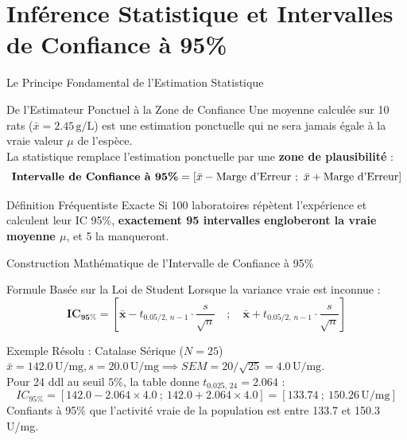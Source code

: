 \documentclass[aspectratio=169,10pt]{beamer}
\begin{document}
\section{Inférence Statistique et Intervalles de Confiance à 95\%}

\begin{frame}{Le Principe Fondamental de l'Estimation Statistique}
  \begin{conceptbox}{De l'Estimateur Ponctuel à la Zone de Confiance}
    Une moyenne calculée sur 10 rats ($\bar{x} = 2.45\,\text{g/L}$) est une estimation ponctuelle qui ne sera jamais égale à la vraie valeur $\mu$ de l'espèce.\\
    La statistique remplace l'estimation ponctuelle par une \textbf{zone de plausibilité} :
    \begin{equation*}
      \text{\textbf{Intervalle de Confiance à 95\%}} = \left[ \bar{x} - \text{Marge d'Erreur} \ ; \ \bar{x} + \text{Marge d'Erreur} \right]
    \end{equation*}
  \end{conceptbox}
  \vspace{1.5mm}
  \begin{biobox}{Définition Fréquentiste Exacte}
    Si 100 laboratoires répètent l'expérience et calculent leur IC 95\%, \textbf{exactement 95 intervalles engloberont la vraie moyenne $\mu$}, et 5 la manqueront.
  \end{biobox}
\end{frame}

\begin{frame}{Construction Mathématique de l'Intervalle de Confiance à 95\%}
  \begin{conceptbox}{Formule Basée sur la Loi de Student}
    Lorsque la variance vraie est inconnue :
    \begin{equation*}
      \mathbf{IC_{95\%}} = \left[ \mathbf{\bar{x}} - t_{0.05/2, \, n-1} \cdot \frac{s}{\sqrt{n}} \quad ; \quad \mathbf{\bar{x}} + t_{0.05/2, \, n-1} \cdot \frac{s}{\sqrt{n}} \right]
    \end{equation*}
  \end{conceptbox}
  \vspace{1mm}
  \begin{biobox}{Exemple Résolu : Catalase Sérique ($N=25$)}
    $\bar{x} = 142.0\,\text{U/mg}, s = 20.0\,\text{U/mg} \implies SEM = 20/\sqrt{25} = 4.0\,\text{U/mg}$.\\
    Pour 24 ddl au seuil $5\%$, la table donne $t_{0.025, \, 24} = 2.064$ :
    \begin{equation*}
      IC_{95\%} = [142.0 - 2.064 \times 4.0 \ ; \ 142.0 + 2.064 \times 4.0] = [\mathbf{133.74} \ ; \ \mathbf{150.26}\,\text{U/mg}]
    \end{equation*}
    Confiants à 95\% que l'activité vraie de la population est entre 133.7 et 150.3 U/mg.
  \end{biobox}
\end{frame}
\end{document}
